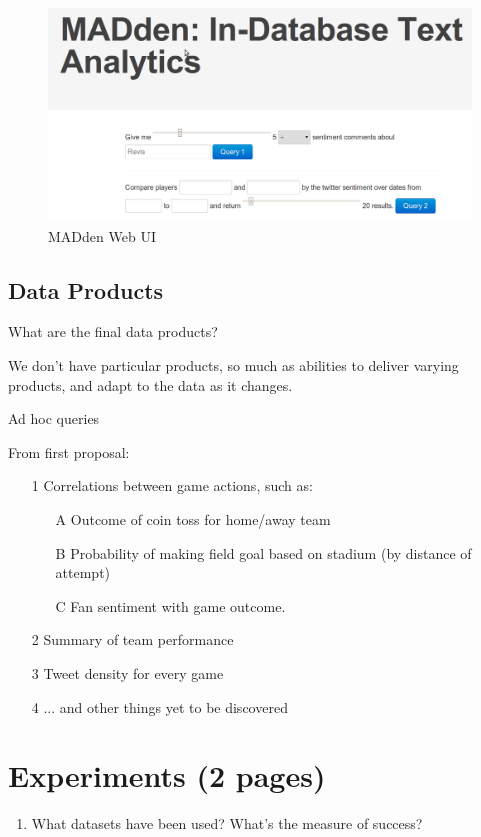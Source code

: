\documentclass{article}
\newcommand{\system}{MADden\xspace}
\begin{document}
\begin{enumerate}
  \begin{figure}
    \begin{center}
      \includegraphics[scale=0.3]{web-ui.png}
      \caption{{\system} Web UI}
      \label{fig:web-ui}
    \end{center}
  \end{figure}




  \subsection{Data Products}
  What are the final data products?

  We don't have particular products, so much as abilities to deliver varying products, and adapt to the data as it changes.

  Ad hoc queries

  From first proposal:
  \begin{enumerate}
  \item[1] Correlations between game actions, such as:
    \begin{enumerate}
    \item[A] Outcome of coin toss for home/away team
    \item[B] Probability of making field goal based on
      stadium (by distance of attempt)
    \item[C] Fan sentiment with game outcome.
    \end{enumerate}
  \item[2] Summary of team performance
  \item[3] Tweet density for every game
  \item[4] ... and other things yet to be discovered
  \end{enumerate}




  \section{Experiments (2 pages)}
  \begin{enumerate}
  \item What datasets have been used? What’s the measure of success?


\end{enumerate}
\end{enumerate}
\end{document}
